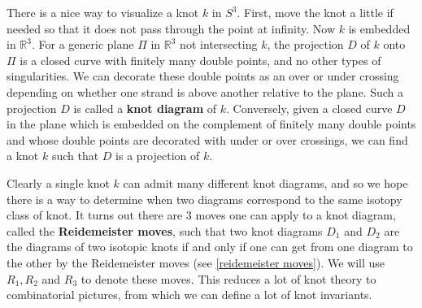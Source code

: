 There is a nice way to visualize a knot $k$ in $S^3$. First, move the knot a little if needed so that it does not pass through the point at infinity. Now $k$ is embedded in $\mathbb R^3$. For a generic plane $\Pi$ in $\mathbb R^3$ not intersecting $k$, the projection $D$ of $k$ onto $\Pi$ is a closed curve with finitely many double points, and no other types of singularities. We can decorate these double points as an over or under crossing depending on whether one strand is above another relative to the plane. Such a projection $D$ is called a \textbf{knot diagram} of $k$. Conversely, given a closed curve $D$ in the plane which is embedded on the complement of finitely many double points and whose double points are decorated with under or over crossings, we can find a knot $k$ such that $D$ is a projection of $k$. 

Clearly a single knot $k$ can admit many different knot diagrams, and so we hope there is a way to determine when two diagrams correspond to the same isotopy class of knot. It turns out there are 3 moves one can apply to a knot diagram, called the \textbf{Reidemeister moves}, such that two knot diagrams $D_1$ and $D_2$ are the diagrams of two isotopic knots if and only if one can get from one diagram to the other by the Reidemeister moves (see \cref{reidemeister moves}). We will use $R_1,R_2$ and $R_3$ to denote these moves. This reduces a lot of knot theory to combinatorial pictures, from which we can define a lot of knot invariants. 

